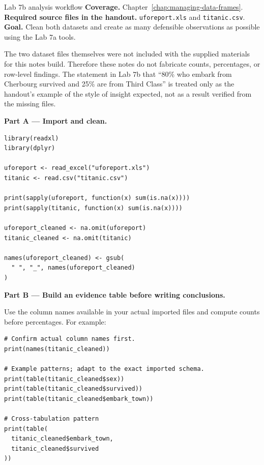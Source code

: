 
\begin{labproject}{Lab 7b analysis workflow}
\textbf{Coverage.} Chapter~\ref{chap:managing-data-frames}.\\
\textbf{Required source files in the handout.} \texttt{uforeport.xls} and \texttt{titanic.csv}.\\
\textbf{Goal.} Clean both datasets and create as many defensible observations as possible using the Lab 7a tools.

\begin{pitfall}
The two dataset files themselves were not included with the supplied materials for this notes build. Therefore these notes do not fabricate counts, percentages, or row-level findings. The statement in Lab 7b that ``80\% who embark from Cherbourg survived and 25\% are from Third Class'' is treated only as the handout's example of the style of insight expected, not as a result verified from the missing files.
\end{pitfall}

\textbf{Part A --- Import and clean.}

\begin{lstlisting}[style=dsr]
library(readxl)
library(dplyr)

uforeport <- read_excel("uforeport.xls")
titanic <- read.csv("titanic.csv")

print(sapply(uforeport, function(x) sum(is.na(x))))
print(sapply(titanic, function(x) sum(is.na(x))))

uforeport_cleaned <- na.omit(uforeport)
titanic_cleaned <- na.omit(titanic)

names(uforeport_cleaned) <- gsub(
  " ", "_", names(uforeport_cleaned)
)
\end{lstlisting}

\textbf{Part B --- Build an evidence table before writing conclusions.}

Use the column names available in your actual imported files and compute counts before percentages. For example:

\begin{lstlisting}[style=dsr]
# Confirm actual column names first.
print(names(titanic_cleaned))

# Example patterns; adapt to the exact imported schema.
print(table(titanic_cleaned$sex))
print(table(titanic_cleaned$survived))
print(table(titanic_cleaned$embark_town))

# Cross-tabulation pattern
print(table(
  titanic_cleaned$embark_town,
  titanic_cleaned$survived
))
\end{lstlisting}


\end{labproject}
